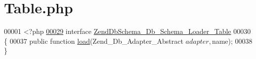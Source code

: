\hypertarget{Loader_2Table_8php}{\section{Table.\-php}
\label{Loader_2Table_8php}
}

\begin{DoxyCode}
00001 <?php
\hypertarget{Loader_2Table_8php_source_l00029}{}\hyperlink{interfaceZendDbSchema__Db__Schema__Loader__Table}{00029} \textcolor{keyword}{interface }\hyperlink{interfaceZendDbSchema__Db__Schema__Loader__Table}{ZendDbSchema\_Db\_Schema\_Loader\_Table}
00030 \{
00037     \textcolor{keyword}{public} \textcolor{keyword}{function} \hyperlink{interfaceZendDbSchema__Db__Schema__Loader__Table_a7e8a4db5f824367515ae7106e472ddfb}{load}(Zend\_Db\_Adapter\_Abstract $adapter, $name);
00038 \}
\end{DoxyCode}
